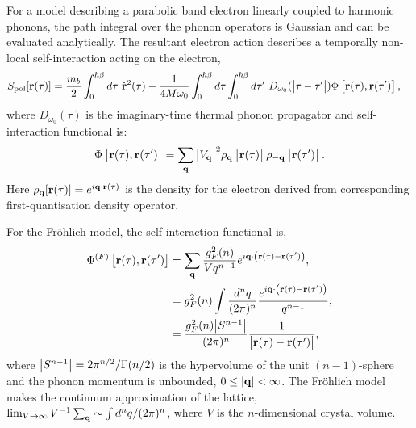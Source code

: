 For a model describing a parabolic band electron linearly coupled to harmonic phonons, the path integral over the phonon operators is Gaussian and can be evaluated analytically. The resultant electron action describes a temporally non-local self-interaction acting on the electron,
\begin{equation} \label{eqn:eph-action}
    \begin{aligned}
        S_{\text{pol}}[\vb{r}(\tau)] &= \frac{m_b}{2} \int_0^{\hbar\beta} d\tau\ \Dot{\vb{r}}^2(\tau) - \frac{1}{4 M \omega_0} \int_0^{\hbar\beta} d\tau \int_0^{\hbar\beta} d\tau'\ D_{\omega_0}(\abs{\tau - \tau'}) \Phi\left[\vb{r}(\tau), \vb{r}(\tau')\right] ,
    \end{aligned}
\end{equation}
where $ D_{\omega_0}(\tau)$ is the imaginary-time thermal phonon propagator and self-interaction functional is:
\begin{equation}
    \Phi\left[\vb{r}(\tau), \vb{r}(\tau')\right] = \sum_{\vb{q}} \abs{V_{\vb{q}}}^2 \rho_{\vb{q}} \left[\vb{r}(\tau)\right] \rho_{\vb{-q}}\left[\vb{r}(\tau')\right].
\end{equation}
Here $\rho_{\vb{q}}[\vb{r}(\tau)] = e^{i \vb{q} \cdot \vb{r}(\tau)}$ is the density for the electron derived from corresponding first-quantisation density operator.

For the Fr\"ohlich model, the self-interaction functional is,
\begin{equation}
    \begin{aligned}
        \Phi^{(F)}\left[\vb{r}(\tau), \vb{r}(\tau')\right] &= \sum_{\vb{q}} \frac{g_{F}^2(n)}{V q^{n-1}} e^{i \vb{q} \cdot \left(\vb{r}(\tau) - \vb{r}(\tau') \right)} , \\
        &= g_{F}^2(n) \int \frac{d^n q}{(2\pi)^n} \frac{e^{i\vb{q}\cdot\left(\vb{r}(\tau) - \vb{r}(\tau')\right)}}{q^{n-1}} , \\
        &= \frac{g^2_F(n) \abs{S^{n-1}}}{(2\pi)^{n}} \frac{1}{\abs{\vb{r}(\tau) - \vb{r}(\tau')}} ,
    \end{aligned}
\end{equation}
where $\abs{S^{n-1}} = 2\pi^{n/2}/\Gamma(n/2)$ is the hypervolume of the unit $(n-1)$-sphere and the phonon momentum is unbounded, $0 \leq \abs{\vb{q}} < \infty$. The Fr\"ohlich model makes the continuum approximation of the lattice, $\lim_{V \to \infty} V^{-1}\sum_{\vb{q}} \sim \int d^nq / (2\pi)^n$, where $V$ is the $n$-dimensional crystal volume.

